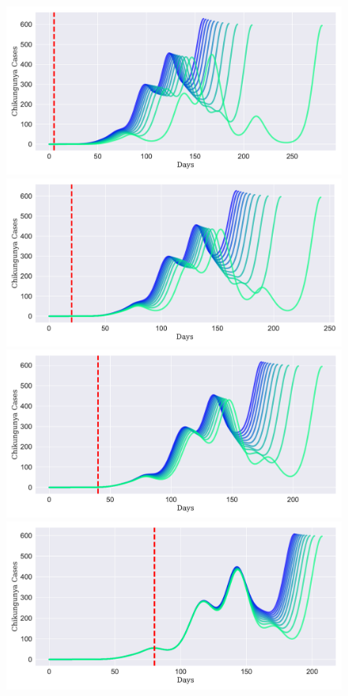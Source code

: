 \documentclass[11pt]{article}
\begin{document}
\begin{figure}[ht]
\centering
\includegraphics[scale=.24]{./interv_005}
\includegraphics[scale=.24]{./interv_020} \\
\includegraphics[scale=.24]{./interv_040}
\includegraphics[scale=.24]{./interv_080} \\

\end{figure}
\end{document}
